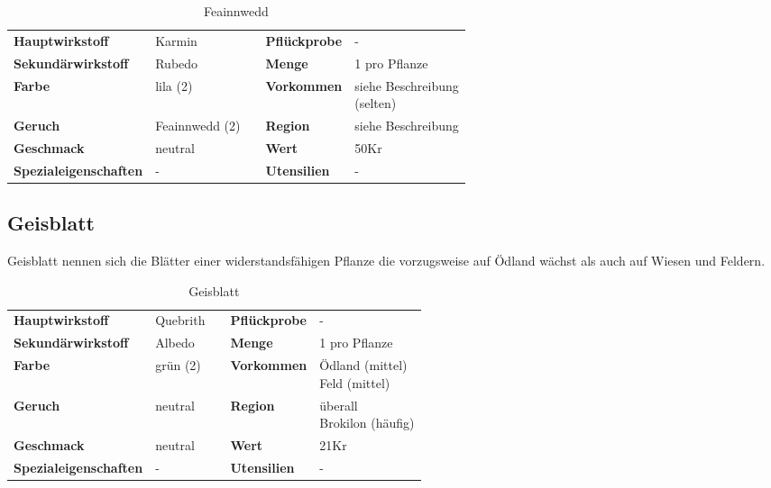 \begin{table}[h] 
\begin{center} 
\begin{tabular}{|l|l|p{1cm}|l|l|} 
  	\cline{1-2} \cline{4-5} 
  	\textbf{Hauptwirkstoff} & Karmin && \textbf{Pflückprobe} & - \\ \cline{1-2} \cline{4-5} 
  	\textbf{Sekundärwirkstoff} & Rubedo && \textbf{Menge} & 1 pro Pflanze \\ \cline{1-2} \cline{4-5} 
  	\textbf{Farbe} & lila (2) && \textbf{Vorkommen} & \brcell{siehe Beschreibung \\ (selten)} \\ \cline{1-2} \cline{4-5} 
  	\textbf{Geruch} & Feainnwedd (2) && \textbf{Region} & siehe Beschreibung \\ \cline{1-2} \cline{4-5} 
  	\textbf{Geschmack} & neutral && \textbf{Wert} & 50Kr \\ \cline{1-2} \cline{4-5} 
  	\textbf{Spezialeigenschaften} & - && \textbf{Utensilien} & - \\ \cline{1-2} \cline{4-5} 
\end{tabular} 
\end{center} 
\caption{Feainnwedd} 
\label{tab:feainnwedd} 
\end{table}


\subsection{Geisblatt}
Geisblatt nennen sich die Blätter einer widerstandsfähigen Pflanze die vorzugsweise auf Ödland wächst als auch auf Wiesen und Feldern. 

\begin{table}[h] 
\begin{center} 
\begin{tabular}{|l|l|p{1cm}|l|l|} 
  	\cline{1-2} \cline{4-5} 
  	\textbf{Hauptwirkstoff} & Quebrith && \textbf{Pflückprobe} & - \\ \cline{1-2} \cline{4-5} 
  	\textbf{Sekundärwirkstoff} & Albedo && \textbf{Menge} & 1 pro Pflanze \\ \cline{1-2} \cline{4-5} 
  	\textbf{Farbe} & grün (2) && \textbf{Vorkommen} & \brcell{Ödland (mittel) \\ Feld (mittel)} \\ \cline{1-2} \cline{4-5} 
  	\textbf{Geruch} & neutral && \textbf{Region} & \brcell{überall \\ Brokilon (häufig)} \\ \cline{1-2} \cline{4-5} 
  	\textbf{Geschmack} & neutral && \textbf{Wert} & 21Kr \\ \cline{1-2} \cline{4-5} 
  	\textbf{Spezialeigenschaften} & - && \textbf{Utensilien} & - \\ \cline{1-2} \cline{4-5} 
\end{tabular} 
\end{center} 
\caption{Geisblatt} 
\label{tab:geisblatt} 
\end{table}



